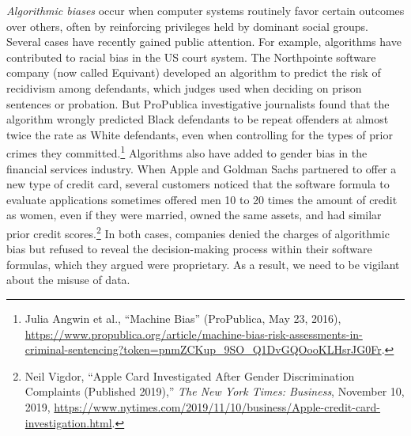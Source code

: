 \documentclass[
  english,
]{book}
\begin{document}
\emph{Algorithmic biases} occur when computer systems routinely favor certain outcomes over others, often by reinforcing privileges held by dominant social groups. Several cases have recently gained public attention. For example, algorithms have contributed to racial bias in the US court system. The Northpointe software company (now called Equivant) developed an algorithm to predict the risk of recidivism among defendants, which judges used when deciding on prison sentences or probation. But ProPublica investigative journalists found that the algorithm wrongly predicted Black defendants to be repeat offenders at almost twice the rate as White defendants, even when controlling for the types of prior crimes they committed.\footnote{Julia Angwin et al., {``Machine {Bias}''} ({ProPublica}, May 23, 2016), \url{https://www.propublica.org/article/machine-bias-risk-assessments-in-criminal-sentencing?token=pnmZCKup_9SO_Q1DvGQOooKLHsrJG0Fr}.} Algorithms also have added to gender bias in the financial services industry. When Apple and Goldman Sachs partnered to offer a new type of credit card, several customers noticed that the software formula to evaluate applications sometimes offered men 10 to 20 times the amount of credit as women, even if they were married, owned the same assets, and had similar prior credit scores.\footnote{Neil Vigdor, {``Apple {Card Investigated After Gender Discrimination Complaints} ({Published} 2019),''} \emph{The New York Times: Business}, November 10, 2019, \url{https://www.nytimes.com/2019/11/10/business/Apple-credit-card-investigation.html}.} In both cases, companies denied the charges of algorithmic bias but refused to reveal the decision-making process within their software formulas, which they argued were proprietary. As a result, we need to be vigilant about the misuse of data.
\end{document}
